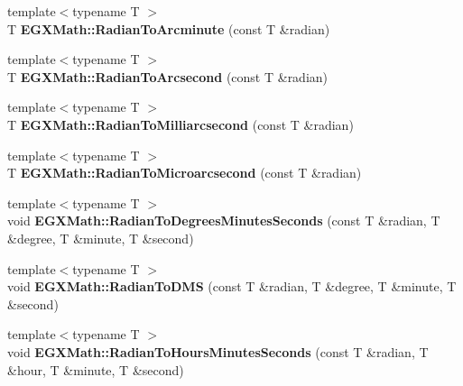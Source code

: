 \begin{DoxyCompactItemize}
{\footnotesize template$<$typename T $>$ }\\T {\bfseries E\+G\+X\+Math\+::\+Radian\+To\+Arcminute} (const T \&radian)
\item 
\mbox{\label{group___angle_conversions_ga2f952f6675a0fc54bf72bfe4e3d2664a}} 
{\footnotesize template$<$typename T $>$ }\\T {\bfseries E\+G\+X\+Math\+::\+Radian\+To\+Arcsecond} (const T \&radian)
\item 
\mbox{\label{group___angle_conversions_ga84fbb494a455cfeb30be62776f96c9a9}} 
{\footnotesize template$<$typename T $>$ }\\T {\bfseries E\+G\+X\+Math\+::\+Radian\+To\+Milliarcsecond} (const T \&radian)
\item 
\mbox{\label{group___angle_conversions_ga3a515ca2838a305fa40750763f546a86}} 
{\footnotesize template$<$typename T $>$ }\\T {\bfseries E\+G\+X\+Math\+::\+Radian\+To\+Microarcsecond} (const T \&radian)
\item 
\mbox{\label{group___angle_conversions_ga1013b63f441961f3d6ee9b88536f74fc}} 
{\footnotesize template$<$typename T $>$ }\\void {\bfseries E\+G\+X\+Math\+::\+Radian\+To\+Degrees\+Minutes\+Seconds} (const T \&radian, T \&degree, T \&minute, T \&second)
\item 
\mbox{\label{group___angle_conversions_ga5e0b805d236e6215ff1e60426ca22dc0}} 
{\footnotesize template$<$typename T $>$ }\\void {\bfseries E\+G\+X\+Math\+::\+Radian\+To\+D\+MS} (const T \&radian, T \&degree, T \&minute, T \&second)
\item 
\mbox{\label{group___angle_conversions_ga3467598d89af2b8ff68af50b39bb19e2}} 
{\footnotesize template$<$typename T $>$ }\\void {\bfseries E\+G\+X\+Math\+::\+Radian\+To\+Hours\+Minutes\+Seconds} (const T \&radian, T \&hour, T \&minute, T \&second)
\item 
\mbox{\label{group___angle_conversions_ga55b5fba9307f34ab8db57391789a90cc}} 

\end{DoxyCompactItemize}
